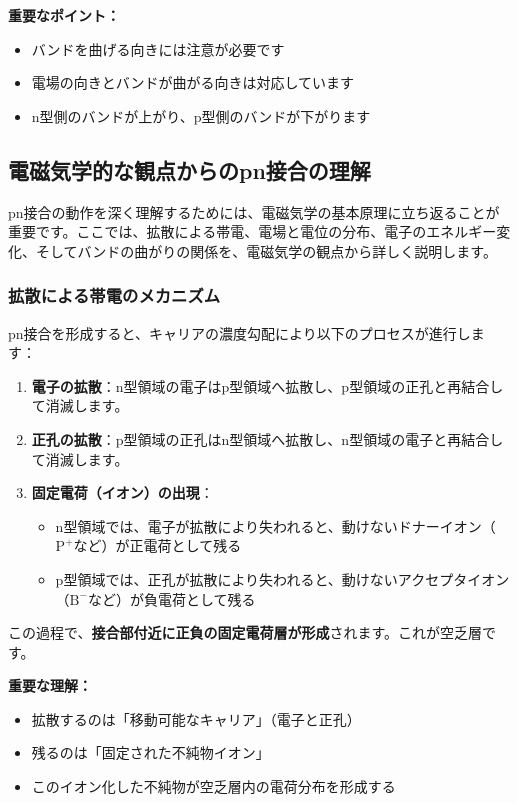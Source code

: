 \textbf{重要なポイント：}
\begin{itemize}
\item バンドを曲げる向きには注意が必要です
\item 電場の向きとバンドが曲がる向きは対応しています
\item n型側のバンドが上がり、p型側のバンドが下がります
\end{itemize}

\subsection{電磁気学的な観点からのpn接合の理解}

pn接合の動作を深く理解するためには、電磁気学の基本原理に立ち返ることが重要です。ここでは、拡散による帯電、電場と電位の分布、電子のエネルギー変化、そしてバンドの曲がりの関係を、電磁気学の観点から詳しく説明します。

\subsubsection{拡散による帯電のメカニズム}

pn接合を形成すると、キャリアの濃度勾配により以下のプロセスが進行します：

\begin{enumerate}
\item \textbf{電子の拡散}：n型領域の電子はp型領域へ拡散し、p型領域の正孔と再結合して消滅します。
\item \textbf{正孔の拡散}：p型領域の正孔はn型領域へ拡散し、n型領域の電子と再結合して消滅します。
\item \textbf{固定電荷（イオン）の出現}：
\begin{itemize}
\item n型領域では、電子が拡散により失われると、動けないドナーイオン（$\text{P}^+$など）が正電荷として残る
\item p型領域では、正孔が拡散により失われると、動けないアクセプタイオン（$\text{B}^-$など）が負電荷として残る
\end{itemize}
\end{enumerate}

この過程で、\textbf{接合部付近に正負の固定電荷層が形成}されます。これが空乏層です。

\textbf{重要な理解：}
\begin{itemize}
\item 拡散するのは「移動可能なキャリア」（電子と正孔）
\item 残るのは「固定された不純物イオン」
\item このイオン化した不純物が空乏層内の電荷分布を形成する
\end{itemize}

